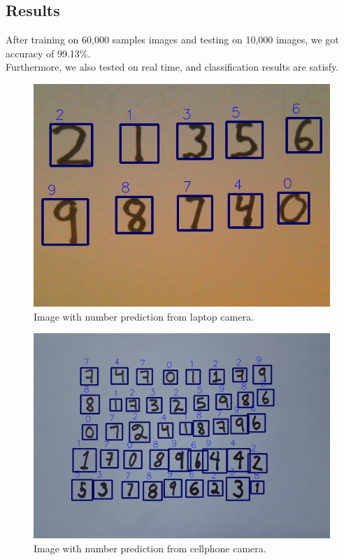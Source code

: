 \documentclass[12pt, letterpaper]{article}
\begin{document}
\subsection{Results}

After training on 60,000 samples images and testing on 10,000 images, we got accuracy of 99.13\%. \\
Furthermore, we also tested on real time, and classification results are satisfy.

\begin{figure}[!h]
	\begin{center}
		\centering
		\includegraphics[width=0.75 \textwidth]{bbox_p11.png}
		\caption{Image with number prediction from laptop camera.}
		\label{fig:live1}
	\end{center}
\end{figure}

\begin{figure}[!h]
	\begin{center}
		\centering
		\includegraphics[width=0.75 \textwidth]{bbox_p2.png}
		\caption{Image with number prediction from cellphone camera.}
		\label{fig:live2}
	\end{center}
\end{figure}
\end{document}
